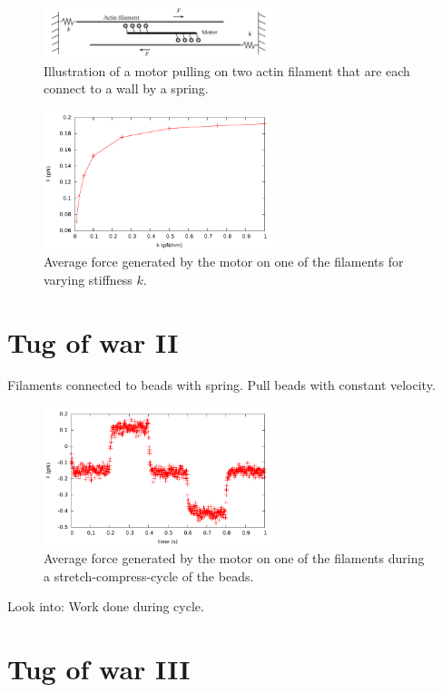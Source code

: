 \documentclass[aps,pre,onecolumn,showpacs,showkeys,a4paper]{revtex4}
\begin{document}
\begin{figure}[h]
\centering
\includegraphics[width=0.6\textwidth,height=!]{tug}
\caption{Illustration of a motor pulling on two actin filament that are each connect to a wall by a spring.}
\label{Fig: tug}
\end{figure}
\begin{figure}[h]
\centering
\includegraphics[width=0.6\textwidth,height=!]{tug_k}
\caption{Average force generated by the motor on one of the filaments for varying stiffness $k$.}
\label{Fig: tug_k}
\end{figure}

\section{Tug of war II}

Filaments connected to beads with spring. 
Pull beads with constant velocity.
\begin{figure}[h]
\centering
\includegraphics[width=0.6\textwidth,height=!]{tug_v}
\caption{Average force generated by the motor on one of the filaments during a stretch-compress-cycle of the beads.}
\label{Fig: tug_v}
\end{figure}
Look into: Work done during cycle.
\section{Tug of war III}
\end{document}
